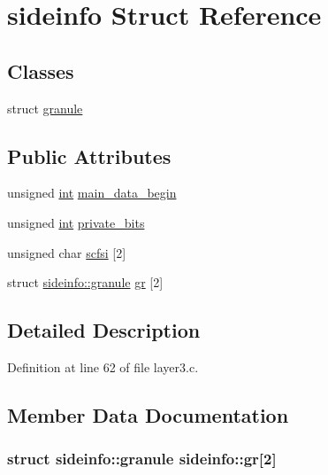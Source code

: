 \hypertarget{structsideinfo}{}\section{sideinfo Struct Reference}
\label{structsideinfo}
\subsection*{Classes}
\begin{DoxyCompactItemize}
\item 
struct \hyperlink{structsideinfo_1_1granule}{granule}
\end{DoxyCompactItemize}
\subsection*{Public Attributes}
\begin{DoxyCompactItemize}
\item 
unsigned \hyperlink{xmltok_8h_a5a0d4a5641ce434f1d23533f2b2e6653}{int} \hyperlink{structsideinfo_a31f43e855dfe735cd84e59e0ee8fe632}{main\+\_\+data\+\_\+begin}
\item 
unsigned \hyperlink{xmltok_8h_a5a0d4a5641ce434f1d23533f2b2e6653}{int} \hyperlink{structsideinfo_ab47893e416cacb23bbde687fca85063f}{private\+\_\+bits}
\item 
unsigned char \hyperlink{structsideinfo_ad8ddfae45f59d7852bb2fea6f79072a0}{scfsi} \mbox{[}2\mbox{]}
\item 
struct \hyperlink{structsideinfo_1_1granule}{sideinfo\+::granule} \hyperlink{structsideinfo_a02e235b5b6b0a9c19ae3367294bfa5c9}{gr} \mbox{[}2\mbox{]}
\end{DoxyCompactItemize}


\subsection{Detailed Description}


Definition at line 62 of file layer3.\+c.



\subsection{Member Data Documentation}
\subsubsection[{\texorpdfstring{gr}{gr}}]{\setlength{\rightskip}{0pt plus 5cm}struct {\bf sideinfo\+::granule}  sideinfo\+::gr\mbox{[}2\mbox{]}}\hypertarget{structsideinfo_a02e235b5b6b0a9c19ae3367294bfa5c9}{}\label{structsideinfo_a02e235b5b6b0a9c19ae3367294bfa5c9}
